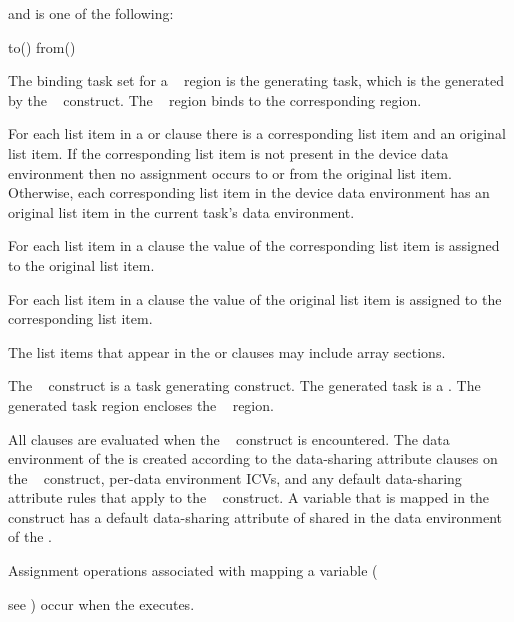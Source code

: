 {{{and  is one of the following:

\begin{indentedcodelist}
to()
from()
\end{indentedcodelist}
\fortranspecificend

\begin{samepage}

\binding
The binding task set for a ~ region is the
generating task, which is the  generated
by the ~ construct. The ~
region binds to the corresponding  region.

\descr
For each list item in a  or  clause there is a corresponding list item and an 
original list item. If the corresponding list item is not present in the device data environment then no assignment occurs to or from the original list item. Otherwise, each corresponding list item in the 
device data environment has an original list item in the current task's data environment.

For each list item in a  clause the value of the corresponding list item is assigned 
to the original list item.

For each list item in a  clause the value of the original list item is assigned to the 
corresponding list item.

\end{samepage}

The list items that appear in the  or  clauses may include array sections.

The ~ construct is a task generating construct.  The generated task is a .  The generated task region encloses the ~ region.

All clauses are evaluated when the ~ construct is encountered.  The data environment of the  is created according to the data-sharing attribute clauses on the ~ construct, per-data environment ICVs, and any default data-sharing attribute rules that apply to the ~ construct.  A variable that is mapped in the ~ construct has a default data-sharing attribute of shared in the data environment of the .

Assignment operations associated with mapping a variable ({see ) occur when the  executes.

}}}}
